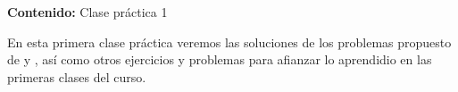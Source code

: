 {\Large
    \textbf{Contenido:} Clase práctica 1
}

En esta primera clase práctica veremos las soluciones de los problemas propuesto de \cite{TD23-clase1} y \cite{TD23-clase2}, así
como otros ejercicios y problemas para afianzar lo aprendidio en las primeras clases del curso.